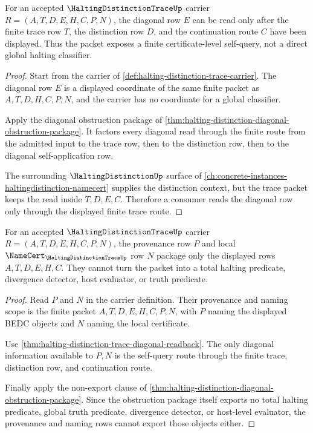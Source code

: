 \begin{theorem}
\label{thm:halting-distinction-trace-diagonal-readback}
For an accepted $\HaltingDistinctionTraceUp$ carrier $R=(A,T,D,E,H,C,P,N)$, the diagonal row $E$ can be read only after the finite trace row $T$, the distinction row $D$, and the continuation route $C$ have been displayed. Thus the packet exposes a finite certificate-level self-query, not a direct global halting classifier.
\end{theorem}
\begin{proof}
Start from the carrier of \autoref{def:halting-distinction-trace-carrier}. The diagonal row $E$ is a displayed coordinate of the same finite packet as $A,T,D,H,C,P,N$, and the carrier has no coordinate for a global classifier.

Apply the diagonal obstruction package of \autoref{thm:halting-distinction-diagonal-obstruction-package}. It factors every diagonal read through the finite route from the admitted input to the trace row, then to the distinction row, then to the diagonal self-application row.

The surrounding $\HaltingDistinctionUp$ surface of \autoref{ch:concrete-instances-haltingdistinction-namecert} supplies the distinction context, but the trace packet keeps the read inside $T,D,E,C$. Therefore a consumer reads the diagonal row only through the displayed finite trace route.
\end{proof}

\begin{theorem}
\label{thm:halting-distinction-trace-provenance-nonescape}
For an accepted $\HaltingDistinctionTraceUp$ carrier $R=(A,T,D,E,H,C,P,N)$, the provenance row $P$ and local $\NameCert_{\HaltingDistinctionTraceUp}$ row $N$ package only the displayed rows $A,T,D,E,H,C$. They cannot turn the packet into a total halting predicate, divergence detector, host evaluator, or truth predicate.
\end{theorem}
\begin{proof}
Read $P$ and $N$ in the carrier definition. Their provenance and naming scope is the finite packet $A,T,D,E,H,C,P,N$, with $P$ naming the displayed BEDC objects and $N$ naming the local certificate.

Use \autoref{thm:halting-distinction-trace-diagonal-readback}. The only diagonal information available to $P,N$ is the self-query route through the finite trace, distinction row, and continuation route.

Finally apply the non-export clause of \autoref{thm:halting-distinction-diagonal-obstruction-package}. Since the obstruction package itself exports no total halting predicate, global truth predicate, divergence detector, or host-level evaluator, the provenance and naming rows cannot export those objects either.
\end{proof}

